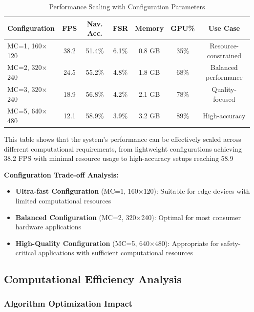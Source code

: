 \documentclass[12pt,oneside]{book}
\begin{document}
\begin{table}[ht]
\centering
\caption{Performance Scaling with Configuration Parameters}
\label{tab:performance_scaling_detailed}
\begin{tabular}{@{}lcccccc@{}}
\toprule
\textbf{Configuration} & \textbf{FPS} & \textbf{Nav. Acc.} & \textbf{FSR} & \textbf{Memory} & \textbf{GPU\%} & \textbf{Use Case} \\
\midrule
MC=1, 160$\times$120 & 38.2 & 51.4\% & 6.1\% & 0.8 GB & 35\% & Resource-constrained \\
MC=2, 320$\times$240 & 24.5 & 55.2\% & 4.8\% & 1.8 GB & 68\% & Balanced performance \\
MC=3, 320$\times$240 & 18.9 & 56.8\% & 4.2\% & 2.1 GB & 78\% & Quality-focused \\
MC=5, 640$\times$480 & 12.1 & 58.9\% & 3.9\% & 3.2 GB & 89\% & High-accuracy \\
\bottomrule
\end{tabular}
\end{table}

This table shows that the system's performance can be effectively scaled across different computational requirements, from lightweight configurations achieving 38.2 FPS with minimal resource usage to high-accuracy setups reaching 58.9%

\textbf{Configuration Trade-off Analysis:}
\begin{itemize}
\item \textbf{Ultra-fast Configuration} (MC=1, 160$\times$120): Suitable for edge devices with limited computational resources
\item \textbf{Balanced Configuration} (MC=2, 320$\times$240): Optimal for most consumer hardware applications
\item \textbf{High-Quality Configuration} (MC=5, 640$\times$480): Appropriate for safety-critical applications with sufficient computational resources
\end{itemize}

\subsection{Computational Efficiency Analysis}

\subsubsection{Algorithm Optimization Impact}
\end{document}
